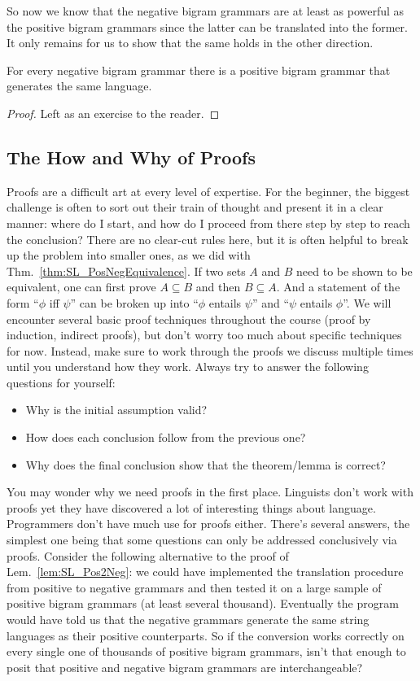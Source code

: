 So now we know that the negative bigram grammars are at least as powerful as the positive bigram grammars since the latter can be translated into the former.
It only remains for us to show that the same holds in the other direction.

\begin{lemma}
    For every negative bigram grammar there is a positive bigram grammar that generates the same language.
\end{lemma}
%
\begin{proof}
    Left as an exercise to the reader.
\end{proof}

\subsection{The How and Why of Proofs}

Proofs are a difficult art at every level of expertise.
For the beginner, the biggest challenge is often to sort out their train of thought and present it in a clear manner: where do I start, and how do I proceed from there step by step to reach the conclusion?
There are no clear-cut rules here, but it is often helpful to break up the problem into smaller ones, as we did with Thm.~\ref{thm:SL_PosNegEquivalence}.
If two sets $A$ and $B$ need to be shown to be equivalent, one can first prove $A \subseteq B$ and then $B \subseteq A$.
And a statement of the form ``$\phi$ iff $\psi$'' can be broken up into ``$\phi$ entails $\psi$'' and ``$\psi$ entails $\phi$''.
We will encounter several basic proof techniques throughout the course (proof by induction, indirect proofs), but don't worry too much about specific techniques for now.
Instead, make sure to work through the proofs we discuss multiple times until you understand how they work.
Always try to answer the following questions for yourself:

\begin{itemize}
    \item Why is the initial assumption valid?
    \item How does each conclusion follow from the previous one?
    \item Why does the final conclusion show that the theorem\slash lemma is correct?
\end{itemize}

You may wonder why we need proofs in the first place.
Linguists don't work with proofs yet they have discovered a lot of interesting things about language.
Programmers don't have much use for proofs either.
There's several answers, the simplest one being that some questions can only be addressed conclusively via proofs.
Consider the following alternative to the proof of Lem.~\ref{lem:SL_Pos2Neg}: we could have implemented the translation procedure from positive to negative grammars and then tested it on a large sample of positive bigram grammars (at least several thousand).
Eventually the program would have told us that the negative grammars generate the same string languages as their positive counterparts.
So if the conversion works correctly on every single one of thousands of positive bigram grammars, isn't that enough to posit that positive and negative bigram grammars are interchangeable?

